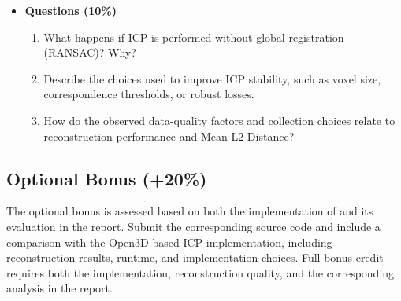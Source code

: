 \documentclass[11pt]{article}
\newcommand{\code}[1]{\texttt{\detokenize{#1}}}
\begin{document}
\begin{itemize}
    The Mean L2 Distance is required for each reconstruction being compared and
    should not be replaced by root mean square error, mean absolute error, or a
    metric computed after an additional fitted alignment.

    \item \textbf{Questions (10\%)}
    \begin{enumerate}
        \item What happens if ICP is performed without global registration
        (RANSAC)? Why?

        \item Describe the choices used to improve ICP stability, such as voxel
        size, correspondence thresholds, or robust losses.

        \item How do the observed data-quality factors and collection choices
        relate to reconstruction performance and Mean L2 Distance?
    \end{enumerate}

\end{itemize}


\subsection{Optional Bonus (+20\%)}
The optional bonus is assessed based on both the implementation of \code{my_local_icp_algorithm} and its evaluation in the report. Submit the corresponding source code and include a comparison with the Open3D-based ICP implementation, including reconstruction results, runtime, and implementation choices. Full bonus credit requires both the implementation, reconstruction quality, and the corresponding analysis in the report.
\end{document}
